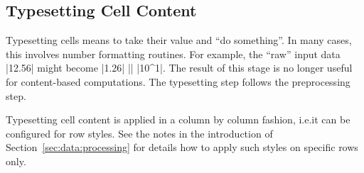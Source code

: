 \subsection{Typesetting Cell Content}

Typesetting cells means to take their value and ``do something''. In many
cases, this involves number formatting routines. For example, the ``raw'' input
data |12.56| might become |1.26| |\cdot| |10^1|. The result of this stage is no
longer useful for content-based computations. The typesetting step follows the
preprocessing step.

Typesetting cell content is applied in a column by column fashion, i.e.\@ it
can be configured for row styles. See the notes in the introduction of
Section~\ref{sec:data:processing} for details how to apply such styles on
specific rows only.

